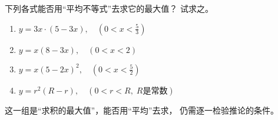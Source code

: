 \begin{example}
    下列各式能否用“平均不等式”去求它的最大值？
    试求之。
\begin{enumerate}[(1)]
    \item $y=3x\cdot (5-3x),\quad \left(0<x<\frac{5}{3}\right)$
    \item $y=x(8-3x),\quad (0<x<2)$
    \item $y=x(5-2x)^2,\quad \left(0<x<\frac{5}{2}\right)$
    \item $y=r^2(R-r),\quad (0<r<R,\; R\text{是常数})$
\end{enumerate}    
\end{example}

\begin{analyze}
这一组是“求积的最大值”，能否用“平均”去求，
    仍需逐一检验推论的条件。
\end{analyze}

